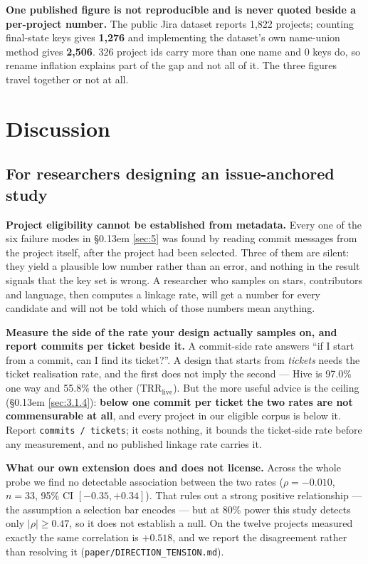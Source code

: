 \documentclass[11pt,a4paper]{article}
\begin{document}
\textbf{One published figure is not reproducible and is never quoted beside a per-project number.} The public Jira dataset reports 1,822 projects; counting final-state keys gives \textbf{1,276} and implementing the dataset's own name-union method gives \textbf{2,506}. 326 project ids carry more than one name and 0 keys do, so rename inflation explains part of the gap and not all of it. The three figures travel together or not at all.


\section{Discussion}
\label{sec:7}

\subsection{For researchers designing an issue-anchored study}
\label{sec:7.1}

\textbf{Project eligibility cannot be established from metadata.} Every one of the six failure modes in \S\kern0.13em \ref{sec:5} was found by reading commit messages from the project itself, after the project had been selected. Three of them are silent: they yield a plausible low number rather than an error, and nothing in the result signals that the key set is wrong. A researcher who samples on stars, contributors and language, then computes a linkage rate, will get a number for every candidate and will not be told which of those numbers mean anything.

\textbf{Measure the side of the rate your design actually samples on, and report commits per ticket beside it.} A commit-side rate answers ``if I start from a commit, can I find its ticket?''. A design that starts from \emph{tickets} needs the ticket realisation rate, and the first does not imply the second --- Hive is 97.0\% one way and 55.8\% the other ($\mathrm{TRR}_\mathrm{live}$). But the more useful advice is the ceiling (\S\kern0.13em \ref{sec:3.1.4}): \textbf{below one commit per ticket the two rates are not commensurable at all}, and every project in our eligible corpus is below it. Report \texttt{commits /\allowbreak{} tickets}; it costs nothing, it bounds the ticket-side rate before any measurement, and no published linkage rate carries it.

\textbf{What our own extension does and does not license.} Across the whole probe we find no detectable association between the two rates ($\rho = -0.010$, $n = 33$, 95\% CI $[-0.35, +0.34]$). That rules out a strong positive relationship --- the assumption a selection bar encodes --- but at 80\% power this study detects only $\lvert \rho \rvert \geq 0.47$, so it does not establish a null. On the twelve projects measured exactly the same correlation is $+0.518$, and we report the disagreement rather than resolving it (\texttt{paper/\allowbreak{}DIRECTION\_\allowbreak{}TENSION.\allowbreak{}md}).
\end{document}
